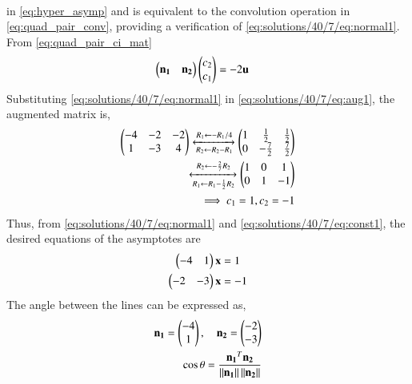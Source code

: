 \begin{enumerate}
\begin{align}
\end{align}
in \eqref{eq:hyper_asymp} and is equivalent to the convolution operation in \eqref{eq:quad_pair_conv},
providing a verification of \eqref{eq:solutions/40/7/eq:normal1}.
From \eqref{eq:quad_pair_ci_mat}
\begin{align}
\begin{pmatrix}\mathbf{n_1} & \mathbf{n_2}\end{pmatrix}\begin{pmatrix}c_2\\c_1\end{pmatrix}&=-2\mathbf{u} \label{eq:solutions/40/7/eq:aug1}
\end{align}
Substituting \eqref{eq:solutions/40/7/eq:normal1} in \eqref{eq:solutions/40/7/eq:aug1}, the augmented matrix is,
\begin{align}
\begin{pmatrix}-4 & -2 & -2 \\ 1 & -3 & 4\end{pmatrix}
\xleftrightarrow[R_2\leftarrow R_2-R_1]{R_1\leftarrow -R_1/4}
\begin{pmatrix}1 &\frac{1}{2} &\frac{1}{2} \\ 0 & -\frac{7}{2} & \frac{7}{2}\end{pmatrix} \label{eq:solutions/40/7/eq:aug5}\\
\xleftrightarrow[R_1\leftarrow R_1-\frac{1}{2}R_2]{R_2\leftarrow -\frac{2}{7}R_2}
\begin{pmatrix}1 &0 &1 \\ 0& 1 & -1\end{pmatrix} \label{eq:solutions/40/7/eq:aug2}\\
\implies c_1 = 1, c_2=-1 \label{eq:solutions/40/7/eq:const1}
\end{align}
Thus, from \eqref{eq:solutions/40/7/eq:normal1} and \eqref{eq:solutions/40/7/eq:const1}, the desired equations of the asymptotes are 
\begin{align}
    \begin{pmatrix}-4 & 1\end{pmatrix}\mathbf{x}&=1\\
    \begin{pmatrix}-2 & -3\end{pmatrix}\mathbf{x}&=-1
\end{align}
The angle between the lines can be expressed as, 
\begin{align}
	\vec{n_1}=\myvec{-4\\1} , \quad \vec{n_2}=\myvec{-2\\-3}\\
	\cos\theta=\frac{\vec{n_1}^T\vec{n_2}}{\norm{\vec{n_1}}\norm{\vec{n_2}}} \\

\end{align}
\end{enumerate}
